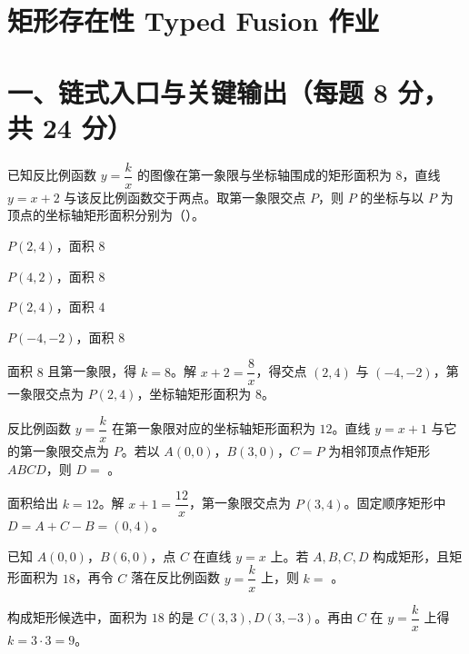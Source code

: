 \documentclass{exam-zh}
\begin{document}
\section*{矩形存在性 Typed Fusion 作业}

\section*{一、链式入口与关键输出（每题 8 分，共 24 分）}


\begin{question}[points=8]
  已知反比例函数 $y=\dfrac{k}{x}$ 的图像在第一象限与坐标轴围成的矩形面积为 $8$，直线 $y=x+2$ 与该反比例函数交于两点。取第一象限交点 $P$，则 $P$ 的坐标与以 $P$ 为顶点的坐标轴矩形面积分别为（\quad）。

  \begin{choices}
    \item $P(2,4)$，面积 $8$
    \item $P(4,2)$，面积 $8$
    \item $P(2,4)$，面积 $4$
    \item $P(-4,-2)$，面积 $8$
  \end{choices}
  \paren[A]
  \begin{solutionblock}
    面积 $8$ 且第一象限，得 $k=8$。解 $x+2=\dfrac8x$，得交点 $(2,4)$ 与 $(-4,-2)$，第一象限交点为 $P(2,4)$，坐标轴矩形面积为 $8$。
  \end{solutionblock}
\end{question}



\begin{question}[points=8]
  反比例函数 $y=\dfrac{k}{x}$ 在第一象限对应的坐标轴矩形面积为 $12$。直线 $y=x+1$ 与它的第一象限交点为 $P$。若以 $A(0,0)$，$B(3,0)$，$C=P$ 为相邻顶点作矩形 $ABCD$，则 $D=$ \underline{\hspace{2cm}}。

  \paren[$(0,4)$]
  \begin{solutionblock}
    面积给出 $k=12$。解 $x+1=\dfrac{12}{x}$，第一象限交点为 $P(3,4)$。固定顺序矩形中 $D=A+C-B=(0,4)$。
  \end{solutionblock}
\end{question}



\begin{question}[points=8]
  已知 $A(0,0)$，$B(6,0)$，点 $C$ 在直线 $y=x$ 上。若 $A,B,C,D$ 构成矩形，且矩形面积为 $18$，再令 $C$ 落在反比例函数 $y=\dfrac{k}{x}$ 上，则 $k=$ \underline{\hspace{2cm}}。

  \paren[$9$]
  \begin{solutionblock}
    构成矩形候选中，面积为 $18$ 的是 $C(3,3),D(3,-3)$。再由 $C$ 在 $y=\dfrac{k}{x}$ 上得 $k=3\cdot3=9$。
  \end{solutionblock}
\end{question}
\end{document}

